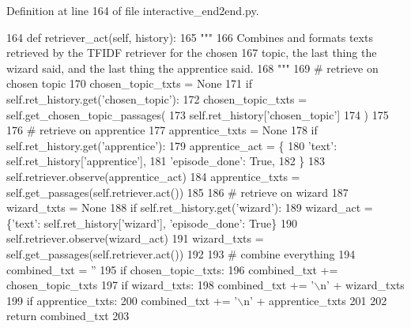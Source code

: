 Definition at line 164 of file interactive\+\_\+end2end.\+py.


\begin{DoxyCode}
164     \textcolor{keyword}{def }retriever\_act(self, history):
165         \textcolor{stringliteral}{"""}
166 \textcolor{stringliteral}{        Combines and formats texts retrieved by the TFIDF retriever for the chosen}
167 \textcolor{stringliteral}{        topic, the last thing the wizard said, and the last thing the apprentice said.}
168 \textcolor{stringliteral}{        """}
169         \textcolor{comment}{# retrieve on chosen topic}
170         chosen\_topic\_txts = \textcolor{keywordtype}{None}
171         \textcolor{keywordflow}{if} self.ret\_history.get(\textcolor{stringliteral}{'chosen\_topic'}):
172             chosen\_topic\_txts = self.get\_chosen\_topic\_passages(
173                 self.ret\_history[\textcolor{stringliteral}{'chosen\_topic'}]
174             )
175 
176         \textcolor{comment}{# retrieve on apprentice}
177         apprentice\_txts = \textcolor{keywordtype}{None}
178         \textcolor{keywordflow}{if} self.ret\_history.get(\textcolor{stringliteral}{'apprentice'}):
179             apprentice\_act = \{
180                 \textcolor{stringliteral}{'text'}: self.ret\_history[\textcolor{stringliteral}{'apprentice'}],
181                 \textcolor{stringliteral}{'episode\_done'}: \textcolor{keyword}{True},
182             \}
183             self.retriever.observe(apprentice\_act)
184             apprentice\_txts = self.get\_passages(self.retriever.act())
185 
186         \textcolor{comment}{# retrieve on wizard}
187         wizard\_txts = \textcolor{keywordtype}{None}
188         \textcolor{keywordflow}{if} self.ret\_history.get(\textcolor{stringliteral}{'wizard'}):
189             wizard\_act = \{\textcolor{stringliteral}{'text'}: self.ret\_history[\textcolor{stringliteral}{'wizard'}], \textcolor{stringliteral}{'episode\_done'}: \textcolor{keyword}{True}\}
190             self.retriever.observe(wizard\_act)
191             wizard\_txts = self.get\_passages(self.retriever.act())
192 
193         \textcolor{comment}{# combine everything}
194         combined\_txt = \textcolor{stringliteral}{''}
195         \textcolor{keywordflow}{if} chosen\_topic\_txts:
196             combined\_txt += chosen\_topic\_txts
197         \textcolor{keywordflow}{if} wizard\_txts:
198             combined\_txt += \textcolor{stringliteral}{'\(\backslash\)n'} + wizard\_txts
199         \textcolor{keywordflow}{if} apprentice\_txts:
200             combined\_txt += \textcolor{stringliteral}{'\(\backslash\)n'} + apprentice\_txts
201 
202         \textcolor{keywordflow}{return} combined\_txt
203 
\end{DoxyCode}
